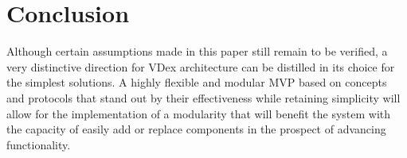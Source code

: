 \documentclass[]{article}
\begin{document}
\section{Conclusion}

Although certain assumptions made in this paper still remain to be verified,
a very distinctive direction for VDex architecture can be distilled in its choice for the simplest solutions. A highly flexible and modular MVP
based on concepts and protocols that stand out by their effectiveness
while retaining simplicity will allow for the implementation of a modularity that will benefit the system with the capacity of easily add or replace components
in the prospect of advancing functionality.



\cite{1}
\cite{2}
\cite{3}
\cite{4}
\cite{5}
\cite{6}
\cite{7}
\cite{8}
\cite{9}
\cite{10}
\cite{11}
\cite{12}
\cite{13}
\cite{14}
\cite{15}
\cite{16}
\cite{17}
\cite{18}
\cite{19}

 
\end{document}
